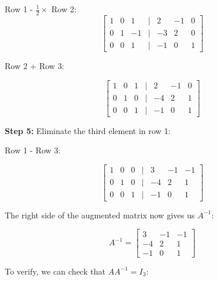 Row 1 - \(\frac{1}{2} \times\) Row 2:
\[
    \begin{bmatrix}
    1 & 0 & 1 & | & 2 & -1 & 0 \\
    0 & 1 & -1 & | & -3 & 2 & 0 \\
    0 & 0 & 1 & | & -1 & 0 & 1
    \end{bmatrix}
\]

Row 2 + Row 3:

\[
    \begin{bmatrix}
    1 & 0 & 1 & | & 2 & -1 & 0 \\
    0 & 1 & 0 & | & -4 & 2 & 1 \\
    0 & 0 & 1 & | & -1 & 0 & 1
    \end{bmatrix}
\]

\textbf{Step 5:} Eliminate the third element in row 1:

Row 1 - Row 3:

\[
    \begin{bmatrix}
    1 & 0 & 0 & | & 3 & -1 & -1 \\
    0 & 1 & 0 & | & -4 & 2 & 1 \\
    0 & 0 & 1 & | & -1 & 0 & 1
    \end{bmatrix}
\]

The right side of the augmented matrix now gives us \(A^{-1}\):

\[
    A^{-1} = 
    \begin{bmatrix}
    3 & -1 & -1 \\
    -4 & 2 & 1 \\
    -1 & 0 & 1
    \end{bmatrix}
\]

To verify, we can check that \(AA^{-1} = I_3\):

